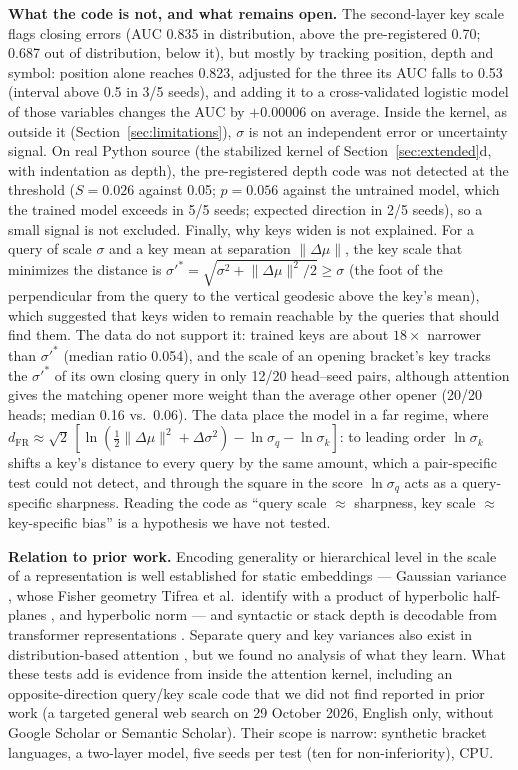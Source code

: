 \documentclass[11pt]{article}
\newcommand{\dFR}{d_{\mathrm{FR}}}
\begin{document}
\textbf{What the code is not, and what remains open.} The second-layer key scale flags closing errors (AUC 0.835 in distribution, above the pre-registered 0.70; 0.687 out of distribution, below it), but mostly by tracking position, depth and symbol: position alone reaches 0.823, adjusted for the three its AUC falls to 0.53 (interval above 0.5 in 3/5 seeds), and adding it to a cross-validated logistic model of those variables changes the AUC by $+0.00006$ on average. Inside the kernel, as outside it (Section~\ref{sec:limitations}), $\sigma$ is not an independent error or uncertainty signal. On real Python source (the stabilized kernel of Section~\ref{sec:extended}d, with indentation as depth), the pre-registered depth code was not detected at the threshold ($S = 0.026$ against 0.05; $p = 0.056$ against the untrained model, which the trained model exceeds in 5/5 seeds; expected direction in 2/5 seeds), so a small signal is not excluded. Finally, why keys widen is not explained. For a query of scale $\sigma$ and a key mean at separation $\lVert\Delta\mu\rVert$, the key scale that minimizes the distance is $\sigma'^{*} = \sqrt{\sigma^2 + \lVert\Delta\mu\rVert^2/2} \ge \sigma$ (the foot of the perpendicular from the query to the vertical geodesic above the key's mean), which suggested that keys widen to remain reachable by the queries that should find them. The data do not support it: trained keys are about $18\times$ narrower than $\sigma'^{*}$ (median ratio 0.054), and the scale of an opening bracket's key tracks the $\sigma'^{*}$ of its own closing query in only 12/20 head--seed pairs, although attention gives the matching opener more weight than the average other opener (20/20 heads; median 0.16 vs.\ 0.06). The data place the model in a far regime, where $\dFR \approx \sqrt{2}\,[\ln(\tfrac{1}{2}\lVert\Delta\mu\rVert^2 + \Delta\sigma^2) - \ln\sigma_q - \ln\sigma_k]$: to leading order $\ln\sigma_k$ shifts a key's distance to every query by the same amount, which a pair-specific test could not detect, and through the square in the score $\ln\sigma_q$ acts as a query-specific sharpness. Reading the code as ``query scale $\approx$ sharpness, key scale $\approx$ key-specific bias'' is a hypothesis we have not tested.

\textbf{Relation to prior work.} Encoding generality or hierarchical level in the scale of a representation is well established for static embeddings --- Gaussian variance \cite{vilnis2015}, whose Fisher geometry Tifrea et al.\ identify with a product of hyperbolic half-planes \cite{tifrea2019}, and hyperbolic norm \cite{nickel2017} --- and syntactic or stack depth is decodable from transformer representations \cite{hewitt2019,sharma2026}. Separate query and key variances also exist in distribution-based attention \cite{erick2023stochastic,fan2022stosa}, but we found no analysis of what they learn. What these tests add is evidence from inside the attention kernel, including an opposite-direction query/key scale code that we did not find reported in prior work (a targeted general web search on 29 October 2026, English only, without Google Scholar or Semantic Scholar). Their scope is narrow: synthetic bracket languages, a two-layer model, five seeds per test (ten for non-inferiority), CPU.
\end{document}
